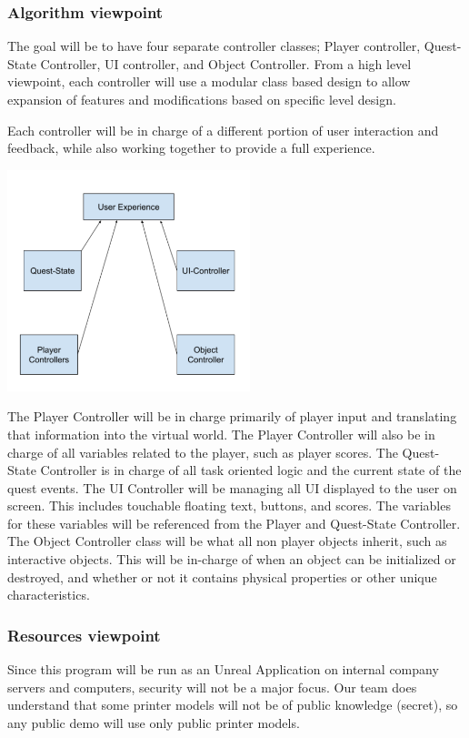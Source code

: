 \documentclass[onecolumn, draftclsnofoot,10pt, compsoc]{IEEEtran}
\newcounter{subsubsubsection}[subsubsection]
\begin{document}
\subsubsection{Algorithm viewpoint}
The goal will be to have four separate controller classes; Player controller, Quest-State Controller, UI controller, and Object Controller. From a high level viewpoint, each controller will use a modular class based design to allow expansion of features and modifications based on specific level design.

Each controller will be in charge of a different portion of user interaction and feedback, while also working together to provide a full experience.

\includegraphics[width=200pt]{AlgoDia.png}

The Player Controller will be in charge primarily of player input and translating that information into the virtual world. The Player Controller will also be in charge of all variables related to the player, such as player scores.
The Quest-State Controller is in charge of all task oriented logic and the current state of the quest events.
The UI Controller will be managing all UI displayed to the user on screen. This includes touchable floating text, buttons, and scores. The variables for these variables will be referenced from the Player and Quest-State Controller.
The Object Controller class will be what all non player objects inherit, such as interactive objects. This will be in-charge of when an object can be initialized or destroyed, and whether or not it contains physical properties or other unique characteristics.

\subsubsection{Resources viewpoint}
Since this program will be run as an Unreal Application on internal company servers and computers, security will not be a major focus. Our team does understand that some printer models will not be of public knowledge (secret), so any public demo will use only public printer models.
\end{document}
